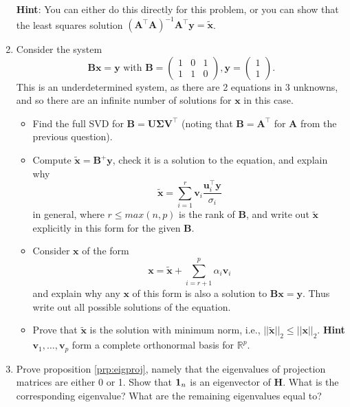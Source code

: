 \documentclass[
]{book}
\providecommand{\tightlist}{%
  \setlength{\itemsep}{0pt}\setlength{\parskip}{0pt}}
\theoremstyle{definition}
\theoremstyle{definition}
\theoremstyle{definition}
\theoremstyle{definition}
\theoremstyle{remark}
\begin{document}
\begin{enumerate}
  \textbf{Hint}: You can either do this directly for this problem, or you can show that the least squares solution \((\mathbf A^\top \mathbf A)^{-1}\mathbf A^\top \mathbf y=\tilde{\mathbf x}\).
\item
  Consider the system
  \[\mathbf B\mathbf x= \mathbf y\mbox{ with }\mathbf B=\left(\begin{array}{ccc}1&0&1\\1&1&0\end{array}
  \right),\mathbf y= \left(\begin{array}{c}1\\1\end{array}
  \right).\]
  This is an underdetermined system, as there are 2 equations in 3 unknowns, and so there are an infinite number of solutions for \(\mathbf x\) in this case.

  \begin{itemize}
  \tightlist
  \item
    Find the full SVD for \(\mathbf B=\mathbf U\boldsymbol{\Sigma}\mathbf V^\top\) (noting that \(\mathbf B=\mathbf A^\top\) for \(\mathbf A\) from the previous question).
  \item
    Compute
    \(\tilde{\mathbf x}=\mathbf B^+\mathbf y\), check it is a solution to the equation, and explain why \[\tilde{\mathbf x}= \sum_{i=1}^r \mathbf v_i \frac{\mathbf u_i^\top \mathbf y}{\sigma_i}\] in general, where \(r\leq max(n,p)\) is the rank of \(\mathbf B\), and write out \(\tilde{\mathbf x}\) explicitly in this form for the given \(\mathbf B\).
  \item
    Consider \(\mathbf x\) of the form
    \[\mathbf x= \tilde{\mathbf x} + \sum_{i=r+1}^p \alpha_i \mathbf v_i\]
    and explain why any \(\mathbf x\) of this form is also a solution to \(\mathbf B\mathbf x=\mathbf y\). Thus write out all possible solutions of the equation.
  \item
    Prove that \(\tilde{\mathbf x}\) is the solution with minimum norm, i.e., \(||\tilde{\mathbf x}||_2 \leq ||\mathbf x||_2\). \textbf{Hint} \(\mathbf v_1, \ldots, \mathbf v_p\) form a complete orthonormal basis for \(\mathbb{R}^p\).
  \end{itemize}
\item
  Prove proposition \ref{prp:eigproj}, namely that the eigenvalues of projection matrices are either 0 or 1.
  Show that \({\bf 1}_n\) is an eigenvector of \(\mathbf H\). What is the corresponding eigenvalue? What are the remaining eigenvalues equal to?
\end{enumerate}
\end{document}
